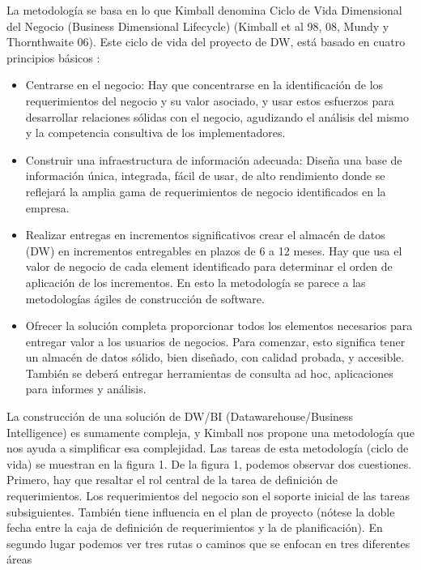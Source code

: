 \documentclass[preprint,12pt]{elsarticle}
\begin{document}
\begin{enumerate}[3.1]
La metodología se basa en lo que Kimball denomina Ciclo de Vida Dimensional del Negocio (Business Dimensional Lifecycle) (Kimball et al 98, 08, Mundy y Thornthwaite 06). Este ciclo de vida del proyecto de DW, está basado en cuatro principios básicos :
\begin{itemize}
  \item Centrarse en el negocio:  Hay que concentrarse en la identificación de los requerimientos del negocio y su valor asociado, y usar estos esfuerzos para desarrollar relaciones sólidas con el negocio, agudizando el análisis del mismo y la competencia consultiva de los implementadores.
\\
  \item Construir una infraestructura de informaci\'on adecuada: Diseña una base de información única, integrada, fácil de usar, de alto rendimiento donde se reflejará la amplia gama de requerimientos de negocio identificados en la empresa.\\
  \item Realizar entregas en incrementos significativos crear el almacén de datos (DW) en incrementos entregables en plazos de 6 a 12 meses. Hay que usa el valor de negocio de cada element identificado para determinar el orden de aplicación de los incrementos. En esto la metodología se parece a las metodologías ágiles de construcción de software.\\
  \item 
Ofrecer la solución completa proporcionar todos los elementos necesarios para entregar valor a los usuarios de negocios. Para comenzar, esto significa tener un almacén de datos sólido, bien diseñado, con calidad probada, y accesible. También se deberá entregar herramientas de consulta ad hoc, aplicaciones para informes y análisis. \\
\end{itemize} 



La construcción de una solución de DW/BI (Datawarehouse/Business Intelligence) es sumamente compleja, y Kimball nos propone una metodología que nos ayuda a simplificar esa complejidad. Las tareas de esta metodología (ciclo de vida) se muestran en la figura 1. 
De la figura 1, podemos observar dos cuestiones. Primero, hay que resaltar el rol central de la tarea de definición de requerimientos. Los requerimientos del negocio son el soporte inicial de las tareas subsiguientes. También tiene influencia en el plan de proyecto (nótese la doble fecha entre la caja de definición de requerimientos y la de planificación). En segundo lugar podemos ver tres rutas o caminos que se enfocan en tres diferentes áreas


\end{enumerate}
\end{document}
